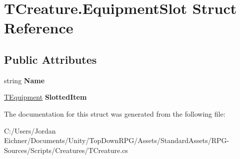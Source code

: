 \hypertarget{struct_t_creature_1_1_equipment_slot}{}\section{T\+Creature.\+Equipment\+Slot Struct Reference}
\label{struct_t_creature_1_1_equipment_slot}
\subsection*{Public Attributes}
\begin{DoxyCompactItemize}
\item 
\hypertarget{struct_t_creature_1_1_equipment_slot_a4ce3ee475e08b0977d0fb59bfc60dc86}{}string {\bfseries Name}\label{struct_t_creature_1_1_equipment_slot_a4ce3ee475e08b0977d0fb59bfc60dc86}

\item 
\hypertarget{struct_t_creature_1_1_equipment_slot_aceb771e476871778c0518706dcdbe21d}{}\hyperlink{class_t_equipment}{T\+Equipment} {\bfseries Slotted\+Item}\label{struct_t_creature_1_1_equipment_slot_aceb771e476871778c0518706dcdbe21d}

\end{DoxyCompactItemize}


The documentation for this struct was generated from the following file\+:\begin{DoxyCompactItemize}
\item 
C\+:/\+Users/\+Jordan Eichner/\+Documents/\+Unity/\+Top\+Down\+R\+P\+G/\+Assets/\+Standard\+Assets/\+R\+P\+G-\/\+Sources/\+Scripts/\+Creatures/T\+Creature.\+cs\end{DoxyCompactItemize}
